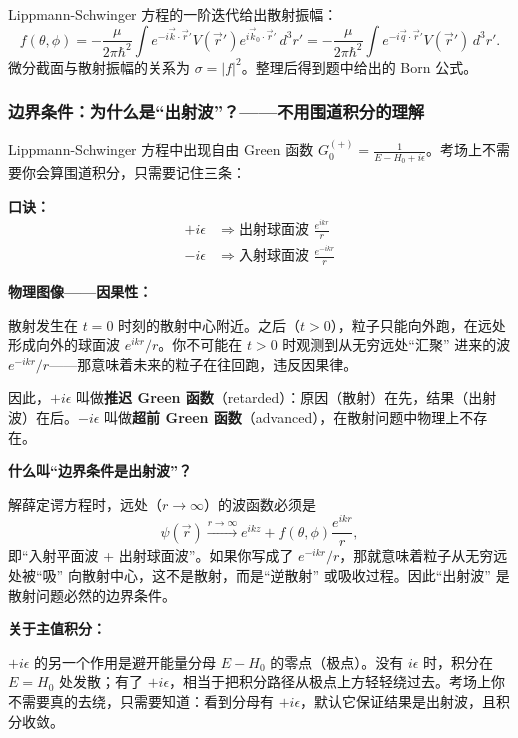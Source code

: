 \begin{formulabox}

Lippmann-Schwinger 方程的一阶迭代给出散射振幅：
\[
f(\theta,\phi) = -\frac{\mu}{2\pi\hbar^2} \int e^{-i\vec{k}\cdot\vec{r}'} V(\vec{r}') e^{i\vec{k}_0\cdot\vec{r}'} \, d^3r' = -\frac{\mu}{2\pi\hbar^2} \int e^{-i\vec{q}\cdot\vec{r}'} V(\vec{r}') \, d^3r'.
\]
微分截面与散射振幅的关系为 $\sigma = |f|^2$。整理后得到题中给出的 Born 公式。

\subsubsection*{边界条件：为什么是``出射波''？——不用围道积分的理解}

Lippmann-Schwinger 方程中出现自由 Green 函数 $G_0^{(+)} = \frac{1}{E-H_0+i\epsilon}$。考场上不需要你会算围道积分，只需要记住三条：

\textbf{口诀：}
\begin{align*}
+i\epsilon &\Longrightarrow \text{出射球面波 } \frac{e^{ikr}}{r} \\
-i\epsilon &\Longrightarrow \text{入射球面波 } \frac{e^{-ikr}}{r}
\end{align*}

\textbf{物理图像——因果性：}

散射发生在 $t = 0$ 时刻的散射中心附近。之后（$t > 0$），粒子只能向外跑，在远处形成向外的球面波 $e^{ikr}/r$。你不可能在 $t > 0$ 时观测到从无穷远处``汇聚'' 进来的波 $e^{-ikr}/r$——那意味着未来的粒子在往回跑，违反因果律。

因此，$+i\epsilon$ 叫做\textbf{推迟 Green 函数}（retarded）：原因（散射）在先，结果（出射波）在后。$-i\epsilon$ 叫做\textbf{超前 Green 函数}（advanced），在散射问题中物理上不存在。

\textbf{什么叫``边界条件是出射波''？}

解薛定谔方程时，远处（$r \to \infty$）的波函数必须是
\[
\psi(\vec{r}) \xrightarrow{r\to\infty} e^{ikz} + f(\theta,\phi) \frac{e^{ikr}}{r},
\]
即``入射平面波 + 出射球面波''。如果你写成了 $e^{-ikr}/r$，那就意味着粒子从无穷远处被``吸'' 向散射中心，这不是散射，而是``逆散射'' 或吸收过程。因此``出射波'' 是散射问题必然的边界条件。

\textbf{关于主值积分：}

$+i\epsilon$ 的另一个作用是避开能量分母 $E-H_0$ 的零点（极点）。没有 $i\epsilon$ 时，积分在 $E = H_0$ 处发散；有了 $+i\epsilon$，相当于把积分路径从极点上方轻轻绕过去。考场上你不需要真的去绕，只需要知道：看到分母有 $+i\epsilon$，默认它保证结果是出射波，且积分收敛。
\end{formulabox}

